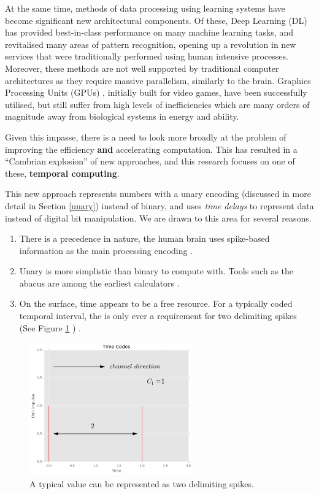 \documentclass{article}
\begin{document}
At the same time, methods of data processing using learning systems have become significant new architectural components. Of these, Deep Learning (DL) \cite{lecun2015deep} has provided best-in-class performance on many machine learning tasks, and revitalised many areas of pattern recognition, opening up a revolution in new services that were traditionally performed using human intensive processes. Moreover, these methods are not well supported by traditional computer architectures \cite{JEON2021167} as they require massive parallelism, similarly to the brain. Graphics Processing Units (GPUs) , initially built for video games, have been successfully utilised, but still suffer from high levels of inefficiencies which are many orders of magnitude away from biological systems in energy and ability.

Given this impasse, there is a need to look more broadly at the problem of improving the efficiency \textbf{and} accelerating computation. This has resulted in a ``Cambrian explosion'' \cite{hennessy2019new} of new approaches, and this research focuses on one of these, \textbf{ temporal computing}.

This new approach represents numbers with a unary encoding (discussed in more detail in Section \ref{unary}) instead of binary, and uses \textit{time delays} to represent data instead of digital bit manipulation. We are drawn to this area for several reasons.

\begin{enumerate}
	\item There is a precedence in nature, the human brain uses spike-based information as the main processing encoding \cite{victor2000brain}.
	\item Unary is more simplistic than binary to compute with. Tools such as the abacus are among the earliest calculators \cite{POPPELBAUM198747}.
	\item On the surface, time appears to be a free resource. For a typically coded temporal interval, the is only ever a requirement for two delimiting spikes (See Figure \ref{fig:two} ) \cite{smith2022temporal}.
\end{enumerate}

\begin{figure}[ht]
	\centering
	\includegraphics[width=200pt]{figures/logfig1.png}
	\caption{A typical value can be represented as two delimiting spikes.}
	\label{fig:two}
\end{figure}
\end{document}

